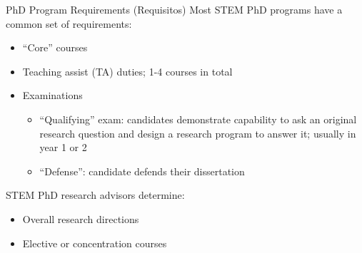 \begin{frame}[fragile]{PhD Program Requirements \textcolor{yellow!80!black}{(Requisitos)}}
    Most STEM PhD programs have a common set of requirements:
    \begin{itemize}
        \item ``Core'' courses
        \item Teaching assist (TA) duties; 1-4 courses in total
        \item Examinations
            \begin{itemize}
                \item ``Qualifying'' exam: candidates demonstrate capability to ask an original research question and design a research program to answer it; usually in year 1 or 2
                \item ``Defense'': candidate defends their dissertation
            \end{itemize}
    \end{itemize}
    STEM PhD research advisors determine:
    \begin{itemize}
        \item Overall research directions
        \item Elective or concentration courses
    \end{itemize}
\end{frame}

